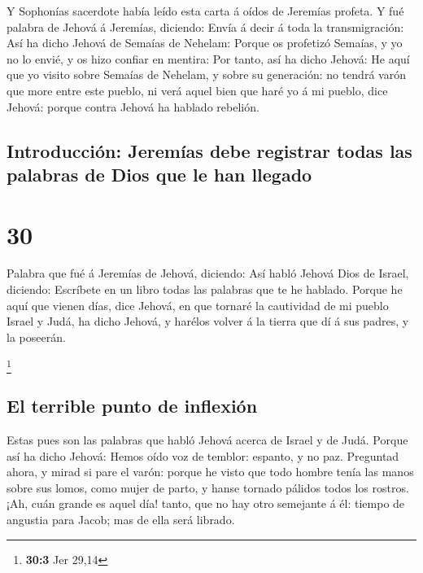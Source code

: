  Y Sophonías sacerdote había leído esta carta á oídos de
Jeremías profeta.  Y fué palabra de Jehová á Jeremías,
diciendo:  Envía á decir á toda la transmigración: Así ha
dicho Jehová de Semaías de Nehelam: Porque os profetizó Semaías, y yo no
lo envié, y os hizo confiar en mentira:  Por tanto, así
ha dicho Jehová: He aquí que yo visito sobre Semaías de Nehelam, y sobre
su generación: no tendrá varón que more entre este pueblo, ni verá aquel
bien que haré yo á mi pueblo, dice Jehová: porque contra Jehová ha
hablado rebelión.

\hypertarget{introducciuxf3n-jeremuxedas-debe-registrar-todas-las-palabras-de-dios-que-le-han-llegado}{%
\subsection{Introducción: Jeremías debe registrar todas las palabras de
Dios que le han
llegado}\label{introducciuxf3n-jeremuxedas-debe-registrar-todas-las-palabras-de-dios-que-le-han-llegado}}

\hypertarget{section-29}{%
\section{30}\label{section-29}}

 Palabra que fué á Jeremías de Jehová, diciendo:
 Así habló Jehová Dios de Israel, diciendo: Escríbete en
un libro todas las palabras que te he hablado.  Porque he
aquí que vienen días, dice Jehová, en que tornaré la cautividad de mi
pueblo Israel y Judá, ha dicho Jehová, y harélos volver á la tierra que
dí á sus padres, y la poseerán.

\footnote{\textbf{30:3} Jer 29,14}

\hypertarget{el-terrible-punto-de-inflexiuxf3n}{%
\subsection{El terrible punto de
inflexión}\label{el-terrible-punto-de-inflexiuxf3n}}

 Estas pues son las palabras que habló Jehová acerca de
Israel y de Judá.  Porque así ha dicho Jehová: Hemos oído
voz de temblor: espanto, y no paz.  Preguntad ahora, y
mirad si pare el varón: porque he visto que todo hombre tenía las manos
sobre sus lomos, como mujer de parto, y hanse tornado pálidos todos los
rostros.  ¡Ah, cuán grande es aquel día! tanto, que no hay
otro semejante á él: tiempo de angustia para Jacob; mas de ella será
librado.

